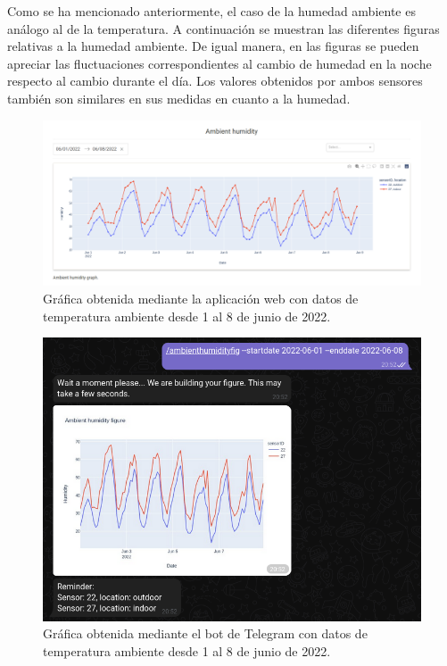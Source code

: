 \documentclass[a4paper, 12pt, oneside]{book}
\begin{document}
Como se ha mencionado anteriormente, el caso de la humedad ambiente es análogo al de la temperatura. A continuación se muestran las diferentes figuras relativas a la humedad ambiente. De igual manera, en las figuras se pueden apreciar las fluctuaciones correspondientes al cambio de humedad en la noche respecto al cambio durante el día. Los valores obtenidos por ambos sensores también son similares en sus medidas en cuanto a la humedad.
 
\begin{figure}[H]
	\centering
    \includegraphics[width=12cm, keepaspectratio]{img/ambient_humidity_01_08_junio}
    \caption{Gráfica obtenida mediante la aplicación web con datos de temperatura ambiente desde 1 al 8 de junio de 2022.}
    \label{figura:ambient_humidity_01_08_junio}
\end{figure}
\begin{figure}[H]
	\centering
    \includegraphics[width=12cm, keepaspectratio]{img/telegram_ambient_humidity_01_08_junio}
    \caption{Gráfica obtenida mediante el bot de Telegram con datos de temperatura ambiente desde 1 al 8 de junio de 2022.}
    \label{figura:telegram_ambient_humidity_01_08_junio}
\end{figure}
\end{document}
